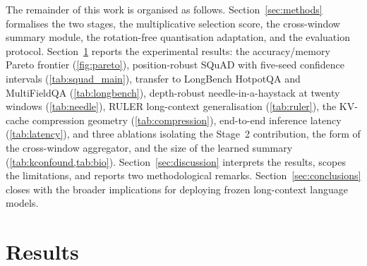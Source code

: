 \documentclass[sn-nature,Numbered]{sn-jnl}
\begin{document}
The remainder of this work is organised as follows. Section~\ref{sec:methods} formalises the two stages, the multiplicative selection score, the cross-window summary module, the rotation-free quantisation adaptation, and the evaluation protocol. Section~\ref{sec:results} reports the experimental results: the accuracy/memory Pareto frontier (\cref{fig:pareto}), position-robust SQuAD with five-seed confidence intervals (\cref{tab:squad_main}), transfer to LongBench HotpotQA and MultiFieldQA (\cref{tab:longbench}), depth-robust needle-in-a-haystack at twenty windows (\cref{tab:needle}), RULER long-context generalisation (\cref{tab:ruler}), the KV-cache compression geometry (\cref{tab:compression}), end-to-end inference latency (\cref{tab:latency}), and three ablations isolating the Stage~2 contribution, the form of the cross-window aggregator, and the size of the learned summary (\cref{tab:kconfound,tab:bio}). Section~\ref{sec:discussion} interprets the results, scopes the limitations, and reports two methodological remarks. Section~\ref{sec:conclusions} closes with the broader implications for deploying frozen long-context language models.






\section{Results}\label{sec:results}
\end{document}
